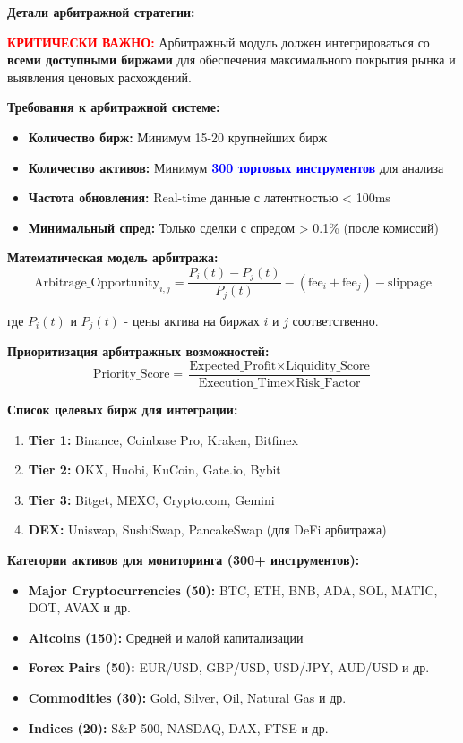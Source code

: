 \documentclass[12pt,a4paper]{article}
\begin{document}
\textbf{Детали арбитражной стратегии:}

\textcolor{red}{\textbf{КРИТИЧЕСКИ ВАЖНО:}} Арбитражный модуль должен интегрироваться со \textbf{всеми доступными биржами} для обеспечения максимального покрытия рынка и выявления ценовых расхождений.

\textbf{Требования к арбитражной системе:}
\begin{itemize}
    \item \textbf{Количество бирж:} Минимум 15-20 крупнейших бирж
    \item \textbf{Количество активов:} Минимум \textcolor{blue}{\textbf{300 торговых инструментов}} для анализа
    \item \textbf{Частота обновления:} Real-time данные с латентностью < 100ms
    \item \textbf{Минимальный спред:} Только сделки с спредом > 0.1\% (после комиссий)
\end{itemize}

\textbf{Математическая модель арбитража:}
\begin{equation}
\text{Arbitrage\_Opportunity}_{i,j} = \frac{P_{i}(t) - P_{j}(t)}{P_{j}(t)} - (\text{fee}_{i} + \text{fee}_{j}) - \text{slippage}
\end{equation}

где $P_{i}(t)$ и $P_{j}(t)$ - цены актива на биржах $i$ и $j$ соответственно.

\textbf{Приоритизация арбитражных возможностей:}
\begin{equation}
\text{Priority\_Score} = \frac{\text{Expected\_Profit} \times \text{Liquidity\_Score}}{\text{Execution\_Time} \times \text{Risk\_Factor}}
\end{equation}

\textbf{Список целевых бирж для интеграции:}
\begin{enumerate}
    \item \textbf{Tier 1:} Binance, Coinbase Pro, Kraken, Bitfinex
    \item \textbf{Tier 2:} OKX, Huobi, KuCoin, Gate.io, Bybit
    \item \textbf{Tier 3:} Bitget, MEXC, Crypto.com, Gemini
    \item \textbf{DEX:} Uniswap, SushiSwap, PancakeSwap (для DeFi арбитража)
\end{enumerate}

\textbf{Категории активов для мониторинга (300+ инструментов):}
\begin{itemize}
    \item \textbf{Major Cryptocurrencies (50):} BTC, ETH, BNB, ADA, SOL, MATIC, DOT, AVAX и др.
    \item \textbf{Altcoins (150):} Средней и малой капитализации
    \item \textbf{Forex Pairs (50):} EUR/USD, GBP/USD, USD/JPY, AUD/USD и др.
    \item \textbf{Commodities (30):} Gold, Silver, Oil, Natural Gas и др.
    \item \textbf{Indices (20):} S\&P 500, NASDAQ, DAX, FTSE и др.
\end{itemize}
\end{document}
